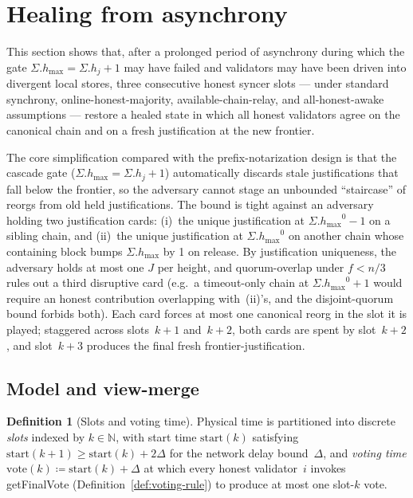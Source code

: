 \documentclass{article}
\newcommand{\hmax}{\ensuremath{h_{\max}}\xspace}
\newcommand{\start}{\ensuremath{\mathrm{start}}}
\newcommand{\vote}{\ensuremath{\mathrm{vote}}}
\newcommand{\getFinalVote}{\textsf{getFinalVote}\xspace}
\theoremstyle{plain}
\theoremstyle{definition}
\newtheorem{definition}{Definition}
\theoremstyle{remark}
\begin{document}
\section{Healing from asynchrony}\label{sec:healing}

This section shows that, after a prolonged period of asynchrony during which the gate $\Sigma.\hmax = \Sigma.h_j + 1$ may have failed and validators may have been driven into divergent local stores, three consecutive honest syncer slots --- under standard synchrony, online-honest-majority, available-chain-relay, and all-honest-awake assumptions --- restore a healed state in which all honest validators agree on the canonical chain and on a fresh justification at the new frontier.

The core simplification compared with the prefix-notarization design is that the cascade gate ($\Sigma.\hmax = \Sigma.h_j + 1$) automatically discards stale justifications that fall below the frontier, so the adversary cannot stage an unbounded ``staircase'' of reorgs from old held justifications.
The bound is tight against an adversary holding two justification cards: (i)~the unique justification at $\Sigma.\hmax^0 - 1$ on a sibling chain, and (ii)~the unique justification at $\Sigma.\hmax^0$ on another chain whose containing block bumps $\Sigma.\hmax$ by 1 on release.
By justification uniqueness, the adversary holds at most one $J$ per height, and quorum-overlap under $f < n/3$ rules out a third disruptive card (e.g.\ a timeout-only chain at $\Sigma.\hmax^0 + 1$ would require an honest contribution overlapping with~(ii)'s, and the disjoint-quorum bound forbids both).
Each card forces at most one canonical reorg in the slot it is played; staggered across slots~$k+1$ and~$k+2$, both cards are spent by slot~$k+2$, and slot~$k+3$ produces the final fresh frontier-justification.

\subsection{Model and view-merge}

\begin{definition}[Slots and voting time]\label{def:slots}
Physical time is partitioned into discrete \emph{slots} indexed by $k \in \mathbb{N}$, with start time $\start(k)$ satisfying $\start(k+1) \geq \start(k) + 2\Delta$ for the network delay bound~$\Delta$, and \emph{voting time} $\vote(k) \coloneqq \start(k) + \Delta$ at which every honest validator~$i$ invokes \getFinalVote{} (Definition~\ref{def:voting-rule}) to produce at most one slot-$k$ vote.
\end{definition}
\end{document}
